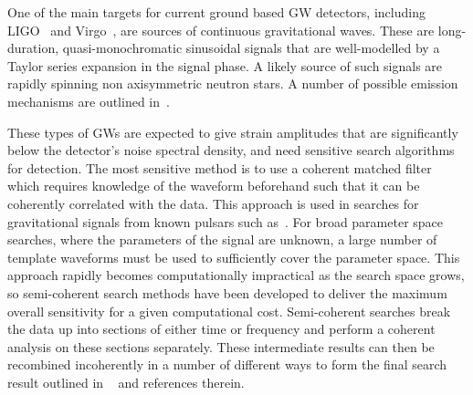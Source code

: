 %
%
One of the main targets for current ground based \gls{GW} detectors, including \gls{LIGO}~\citep{abbott2009LIGOLaser, aasi2015AdvancedLIGO} and Virgo~\citep{acernese2008StatusVirgo, acernese2015AdvancedVirgo}, are sources of continuous gravitational waves. These are long-duration, quasi-monochromatic  sinusoidal signals that are well-modelled by a Taylor series expansion in the signal phase. A likely source of such signals are rapidly spinning non axisymmetric neutron stars.  A number of possible emission mechanisms are outlined in~\citep{prix2009GravitationalWaves,owen2009ProbingNeutron}.

%
%
These types of \glspl{GW} are expected to give strain amplitudes that are significantly below the detector's noise spectral density, and need sensitive search algorithms for detection. The most sensitive method is to use a coherent matched filter which requires knowledge of the waveform beforehand such that it can be coherently correlated with the data. This approach is used in searches for gravitational signals from known pulsars such as~\citep{dupuis2005BayesianEstimation,astone2010MethodDetection,schutz1998DataAnalysis,collaboration2017FirstSearch,abbott2019SearchesGravitational}. For broad parameter space searches, where the parameters of the signal are unknown, a large number of template waveforms must be used to sufficiently cover the parameter space.  This approach rapidly becomes computationally impractical as the search space grows, so semi-coherent search methods have been developed to deliver the maximum overall sensitivity for a given computational cost. Semi-coherent searches break the data up into sections of either time or frequency and perform a coherent analysis on these sections separately. These intermediate results can then be recombined incoherently in a number of different ways to form the final search result outlined in ~\citep{creighton2000SearchingPeriodic,abbott2019AllskySearch} and references therein.


